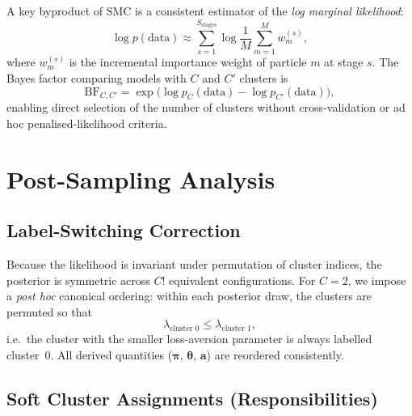 \documentclass[12pt, a4paper]{article}
\newcommand{\btheta}{\bm{\theta}}
\newcommand{\bpi}{\bm{\pi}}
\newcommand{\ba}{\mathbf{a}}
\begin{document}
A key byproduct of SMC is a consistent estimator of the
\emph{log marginal likelihood}:
\begin{equation}
  \log p(\mathrm{data})
  \approx \sum_{s=1}^{S_{\mathrm{stages}}}
           \log \frac{1}{M} \sum_{m=1}^{M}
                w_m^{(s)},
  \label{eq:log_ml}
\end{equation}
where $w_m^{(s)}$ is the incremental importance weight of particle $m$ at stage
$s$.  The Bayes factor comparing models with $C$ and $C'$ clusters is
\begin{equation}
  \mathrm{BF}_{C,C'} = \exp\!\bigl(\log p_{C}(\mathrm{data})
                                  - \log p_{C'}(\mathrm{data})\bigr),
  \label{eq:bf}
\end{equation}
enabling direct selection of the number of clusters without cross-validation or
ad hoc penalised-likelihood criteria.

\section{Post-Sampling Analysis}
\label{sec:postproc}

\subsection{Label-Switching Correction}
\label{sec:label_switching}

Because the likelihood is invariant under permutation of cluster indices, the
posterior is symmetric across $C!$ equivalent configurations.  For $C = 2$, we
impose a \emph{post hoc} canonical ordering: within each posterior draw, the
clusters are permuted so that
\begin{equation}
  \lambda_{\text{cluster 0}} \leq \lambda_{\text{cluster 1}},
  \label{eq:label_switch}
\end{equation}
i.e.\ the cluster with the smaller loss-aversion parameter is always labelled
cluster~0.  All derived quantities ($\bpi$, $\btheta$, $\ba$) are reordered
consistently.

\subsection{Soft Cluster Assignments (Responsibilities)}
\label{sec:responsibilities}
\end{document}
